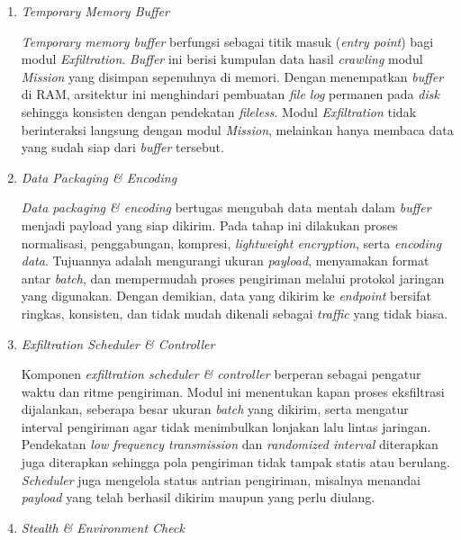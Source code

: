 \begin{enumerate}
    \item \textit{Temporary Memory Buffer}

    \textit{Temporary memory buffer} berfungsi sebagai titik masuk (\textit{entry point}) bagi 
    modul \textit{Exfiltration}. \textit{Buffer} ini berisi kumpulan data hasil \textit{crawling} 
    modul \textit{Mission} yang disimpan sepenuhnya di memori. Dengan menempatkan 
    \textit{buffer} di RAM, arsitektur ini menghindari pembuatan \textit{file log} permanen 
    pada \textit{disk} sehingga konsisten dengan pendekatan \textit{fileless}. Modul 
    \textit{Exfiltration} tidak berinteraksi langsung dengan modul \textit{Mission}, melainkan 
    hanya membaca data yang sudah siap dari \textit{buffer} tersebut.

    \item \textit{Data Packaging \& Encoding}
    
    \textit{Data packaging \& encoding} bertugas mengubah data mentah dalam \textit{buffer} 
    menjadi payload yang siap dikirim. Pada tahap ini dilakukan proses normalisasi, 
    penggabungan, kompresi, \textit{lightweight encryption}, serta \textit{encoding data}. Tujuannya adalah mengurangi ukuran \textit{payload}, 
    menyamakan format antar \textit{batch}, dan mempermudah proses pengiriman melalui protokol 
    jaringan yang digunakan. Dengan demikian, data yang dikirim ke \textit{endpoint} bersifat 
    ringkas, konsisten, dan tidak mudah dikenali sebagai \textit{traffic} yang tidak biasa.

    \item \textit{Exfiltration Scheduler \& Controller}
    
    Komponen \textit{exfiltration scheduler \& controller} berperan sebagai pengatur waktu dan 
    ritme pengiriman. Modul ini menentukan kapan proses eksfiltrasi dijalankan, seberapa besar ukuran 
    \textit{batch} yang dikirim, serta mengatur interval pengiriman agar tidak menimbulkan lonjakan 
    lalu lintas jaringan. Pendekatan \textit{low frequency transmission} dan \textit{randomized interval} 
    diterapkan juga diterapkan sehingga pola pengiriman tidak tampak statis atau berulang. 
    \textit{Scheduler} juga mengelola status antrian pengiriman, misalnya menandai \textit{payload} 
    yang telah berhasil dikirim maupun yang perlu diulang.
    
    \item \textit{Stealth \& Environment Check}
    

\end{enumerate}
